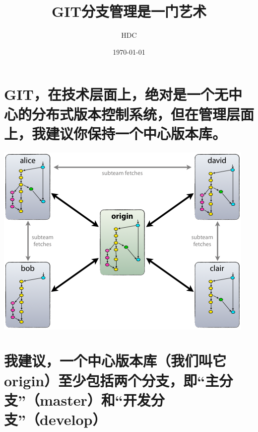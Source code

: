 \documentclass[11pt]{article}
\title{GIT分支管理是一门艺术}
\author{HDC}
\date{\today}
\begin{document}
\maketitle

\setcounter{tocdepth}{3}
\tableofcontents
\vspace*{1cm}


\section{GIT，在技术层面上，绝对是一个无中心的分布式版本控制系统，但在管理层面上，我建议你保持一个中心版本库。}
\label{sec-1}

\includegraphics[width=.9\linewidth]{images/105017.png}
\section{我建议，一个中心版本库（我们叫它origin）至少包括两个分支，即“主分支”（master）和“开发分支”（develop）}
\label{sec-2}
\end{document}
